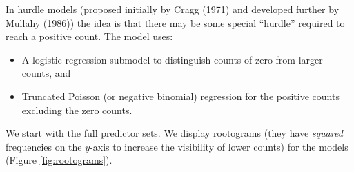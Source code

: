 \documentclass[10pt,]{scrartcl}
\begin{document}
In hurdle models (proposed initially by Cragg (1971) and developed
further by Mullahy (1986)) the idea is that there may be some special
``hurdle'' required to reach a positive count. The model uses:

\begin{itemize}
\item A logistic regression  submodel to distinguish counts of zero from larger counts, and
\item  Truncated Poisson (or negative binomial) regression for the positive counts  excluding the zero counts.
\end{itemize}

We start with the full predictor sets. We display rootograms (they have
\emph{squared} frequencies on the \(y\)-axis to increase the visibility
of lower counts) for the models (Figure \ref{fig:rootograms}).

\footnotesize
\end{document}
